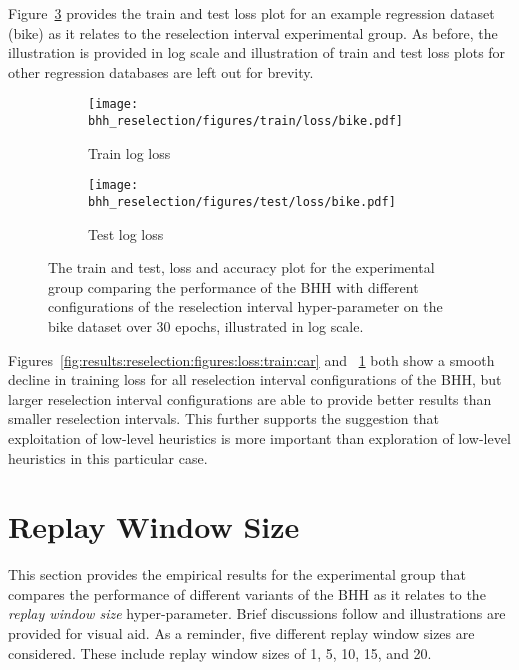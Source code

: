 Figure~\ref{fig:results:reselection:figures:bike} provides the train and test loss plot for an example regression dataset (bike) as it relates to the reselection interval experimental group. As before, the illustration is provided in log scale and illustration of train and test loss plots for other regression databases are left out for brevity.

\begin{figure}[htbp]
	\begin{subfigure}{0.5\textwidth}
		\centering
		\texttt{[image: bhh\_reselection/figures/train/loss/bike.pdf]}
		\caption{Train log loss}
		\label{fig:results:reselection:figures:loss:train:bike}
	\end{subfigure}
	\begin{subfigure}{0.5\textwidth}
		\centering
		\texttt{[image: bhh\_reselection/figures/test/loss/bike.pdf]}
		\caption{Test log loss}
		\label{fig:results:reselection:figures:loss:test:bike}
	\end{subfigure}
	\par\bigskip
	\caption{The train and test, loss and accuracy plot for the experimental group comparing the performance of the \acs{BHH} with different configurations of the reselection interval hyper-parameter on the bike dataset over 30 epochs, illustrated in log scale.}
	\label{fig:results:reselection:figures:bike}
\end{figure}

Figures~\ref{fig:results:reselection:figures:loss:train:car} and ~\ref{fig:results:reselection:figures:loss:train:bike} both show a smooth decline in training loss for all reselection interval configurations of the \acs{BHH}, but larger reselection interval configurations are able to provide better results than smaller reselection intervals. This further supports the suggestion that exploitation of low-level heuristics is more important than exploration of low-level heuristics in this particular case.

\section{Replay Window Size}\label{sec:results:replay}

This section provides the empirical results for the experimental group that compares the performance of different variants of the \acs{BHH} as it relates to the \textit{replay window size} hyper-parameter. Brief discussions follow and illustrations are provided for visual aid. As a reminder, five different replay window sizes are considered. These include replay window sizes of 1, 5, 10, 15, and 20.

